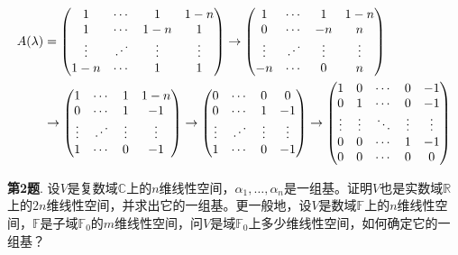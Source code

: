 \begin{align*}
    A(\lambda) & = \begin{pmatrix} 1 & \cdots & 1 & 1-n \\ 1 & \cdots & 1-n & 1 \\ \vdots & \reflectbox{$\ddots$} & \vdots & \vdots \\ 1-n & \cdots & 1 & 1 \end{pmatrix} \to \begin{pmatrix} 1 & \cdots & 1 & 1-n \\ 0 & \cdots & -n & n \\ \vdots & \reflectbox{$\ddots$} & \vdots & \vdots \\ -n & \cdots & 0 & n \end{pmatrix} \\
    & \to \begin{pmatrix} 1 & \cdots & 1 & 1-n \\ 0 & \cdots & 1 & -1 \\ \vdots & \reflectbox{$\ddots$} & \vdots & \vdots \\ 1 & \cdots & 0 & -1 \end{pmatrix} \to \begin{pmatrix} 0 & \cdots & 0 & 0 \\ 0 & \cdots & 1 & -1 \\ \vdots & \reflectbox{$\ddots$} & \vdots & \vdots \\ 1 & \cdots & 0 & -1 \end{pmatrix} \to \begin{pmatrix} 1 & 0 & \cdots & 0 & -1 \\ 0 & 1 & \cdots & 0 & -1 \\ \vdots & \vdots & \ddots & \vdots & \vdots \\ 0 & 0 & \cdots & 1 & -1 \\ 0 & 0 & \cdots & 0 & 0 \end{pmatrix}
\end{align*}

\newpageorvspace

{\bf 第2题}. 设$V$是复数域$\mathbb{C}$上的$n$维线性空间，$\alpha_1,\ldots,\alpha_n$是一组基。证明$V$也是实数域$\mathbb{R}$上的$2n$维线性空间，并求出它的一组基。更一般地，设$V$是数域$\mathbb{F}$上的$n$维线性空间，$\mathbb{F}$是子域$\mathbb{F}_0$的$m$维线性空间，问$V$是域$\mathbb{F}_0$上多少维线性空间，如何确定它的一组基？

